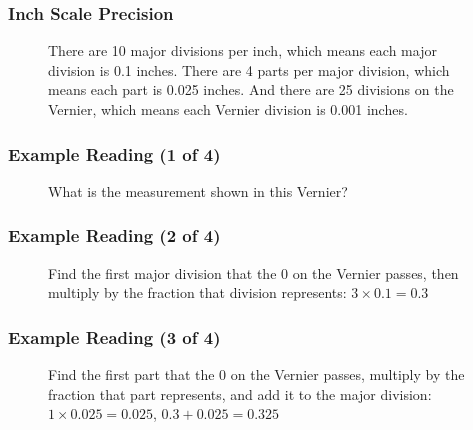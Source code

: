 \begin{frame}
	\frametitle{Inch Scale Precision}

    \begin{figure}
        \centering
        \resizebox{0.625\columnwidth}{!}{
            
            }
        
        \vspace{0.5em}
        {\footnotesize There are 10 major divisions per inch, which means each major division is 0.1 inches. There are 4 parts per major division, which means each part is 0.025 inches. And there are 25 divisions on the Vernier, which means each Vernier division is 0.001 inches.\par}
    \end{figure} 
\end{frame}

\begin{frame}
	\frametitle{Example Reading (1 of 4)}

    \begin{figure}
        \centering
        \resizebox{0.75\columnwidth}{!}{
            
            }
        
        \vspace{0.5em}
        {\footnotesize What is the measurement shown in this Vernier?\par}
    \end{figure}  
\end{frame}

\begin{frame}
	\frametitle{Example Reading (2 of 4)}

    \begin{figure}
        \centering
        \resizebox{0.75\columnwidth}{!}{
            
            }
        
        \vspace{0.5em}
        {\footnotesize Find the first major division that the 0 on the Vernier passes, then multiply by the fraction that division represents: $3 \times 0.1=0.3$\par}
    \end{figure}  
\end{frame}

\begin{frame}
	\frametitle{Example Reading (3 of 4)}
    
    \begin{figure}
        \centering
        \resizebox{0.75\columnwidth}{!}{
            
            }
        
        \vspace{0.5em}
        {\footnotesize Find the first part that the 0 on the Vernier passes, multiply by the fraction that part represents, and add it to the major division: $1 \times 0.025=0.025$, $0.3+0.025=0.325$\par}
    \end{figure} 
\end{frame}

